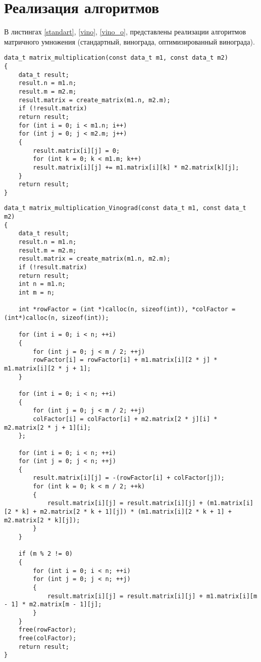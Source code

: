 \section{Реализация алгоритмов}
В листингах \ref{standart}, \ref{vino}, \ref{vino_o}, представлены реализации алгоритмов матричного умножения (стандартный, винограда, оптимизированный винограда). 
\begin{center}
\begin{lstlisting}[label=standart, caption={Стандартный алгоритм умножения матриц}]
data_t matrix_multiplication(const data_t m1, const data_t m2)
{
	data_t result;
	result.n = m1.n;
	result.m = m2.m;
	result.matrix = create_matrix(m1.n, m2.m);
	if (!result.matrix)
	return result;
	for (int i = 0; i < m1.n; i++)
	for (int j = 0; j < m2.m; j++)
	{
		result.matrix[i][j] = 0;
		for (int k = 0; k < m1.m; k++)
		result.matrix[i][j] += m1.matrix[i][k] * m2.matrix[k][j];
	}
	return result;
}
\end{lstlisting}
\end{center}
\newpage
\begin{center}
\begin{lstlisting}[label=vino, caption={Алгоритм Винограда умножения матриц}]
data_t matrix_multiplication_Vinograd(const data_t m1, const data_t m2)
{
	data_t result;
	result.n = m1.n;
	result.m = m2.m;
	result.matrix = create_matrix(m1.n, m2.m);
	if (!result.matrix)
	return result;
	int n = m1.n;
	int m = n;
	
	int *rowFactor = (int *)calloc(n, sizeof(int)), *colFactor = (int*)calloc(n, sizeof(int));
	
	for (int i = 0; i < n; ++i)
	{
		for (int j = 0; j < m / 2; ++j)
		rowFactor[i] = rowFactor[i] + m1.matrix[i][2 * j] * m1.matrix[i][2 * j + 1];
	}
	
	for (int i = 0; i < n; ++i)
	{
		for (int j = 0; j < m / 2; ++j)
		colFactor[i] = colFactor[i] + m2.matrix[2 * j][i] * m2.matrix[2 * j + 1][i];
	};
	
	for (int i = 0; i < n; ++i)
	for (int j = 0; j < n; ++j)
	{
		result.matrix[i][j] = -(rowFactor[i] + colFactor[j]);
		for (int k = 0; k < m / 2; ++k)
		{
			result.matrix[i][j] = result.matrix[i][j] + (m1.matrix[i][2 * k] + m2.matrix[2 * k + 1][j]) * (m1.matrix[i][2 * k + 1] + m2.matrix[2 * k][j]);
		}
	}
	
	if (m % 2 != 0)
	{
		for (int i = 0; i < n; ++i)
		for (int j = 0; j < n; ++j)
		{
			result.matrix[i][j] = result.matrix[i][j] + m1.matrix[i][m - 1] * m2.matrix[m - 1][j];
		}
	}
	free(rowFactor);
	free(colFactor);
	return result;
}
\end{lstlisting}
\end{center}
